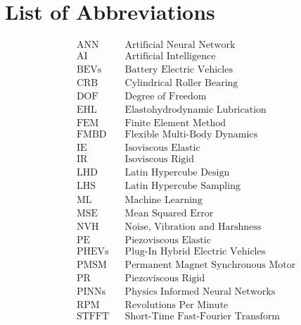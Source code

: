 
\chapter*{List of Abbreviations}
\begin{align*}
	&\text{ANN} &&\text{Artificial Neural Network}\\
	&\text{AI} &&\text{Artificial Intelligence}\\
	&\text{BEVs} &&\text{Battery Electric Vehicles}\\
	&\text{CRB} &&\text{Cylindrical Roller Bearing}\\
	&\text{DOF} &&\text{Degree of Freedom}\\
	&\text{EHL} &&\text{Elastohydrodynamic Lubrication}\\
	&\text{FEM} &&\text{Finite Element Method}\\
	&\text{FMBD} &&\text{Flexible Multi-Body Dynamics}\\
	&\text{IE} &&\text{Isoviscous Elastic}\\
	&\text{IR} &&\text{Isoviscous Rigid}\\
	&\text{LHD} &&\text{Latin Hypercube Design}\\
	&\text{LHS} &&\text{Latin Hypercube Sampling}\\
	&\text{ML} &&\text{Machine Learning}\\
	&\text{MSE} &&\text{Mean Squared Error}\\
	&\text{NVH} &&\text{Noise, Vibration and Harshness}\\
	&\text{PE} &&\text{Piezoviscous Elastic}\\
	&\text{PHEVs} &&\text{Plug-In Hybrid Electric Vehicles}\\
	&\text{PMSM} &&\text{Permanent Magnet Synchronous Motor}\\
	&\text{PR} &&\text{Piezoviscous Rigid}\\
	&\text{PINNs} &&\text{Physics Informed Neural Networks}\\
	&\text{RPM} &&\text{Revolutions Per Minute}\\
	&\text{STFFT} &&\text{Short-Time Fast-Fourier Transform}\\
\end{align*}
